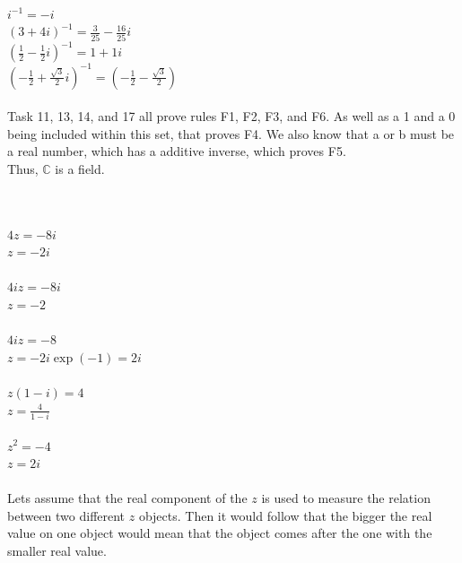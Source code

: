 \documentclass[12pt]{article}
\begin{document}
\\

$i^{-1} = -i$\\

$(3+4i)^{-1} = \frac{3}{25} - \frac{16}{25}i$\\

$(\frac{1}{2} - \frac{1}{2}i)^{-1} = 1 + 1i$\\

$(-\frac{1}{2} + \frac{\sqrt{3}}{2}i)^{-1} = (-\frac{1}{2}-\frac{\sqrt{3}}{2})$\\


\\
Task 11, 13, 14, and 17 all prove rules F1, F2, F3, and F6.
As well as a 1 and a 0 being included within this set, that proves F4. 
We also know that a or b must be a real number, which has a additive inverse, which proves F5.\\

Thus, $\mathbb{C}$ is a field.

\\

\\
$4z = -8i$\\
$z = -2i$\\

\\
$4iz = -8i$\\
$z = -2$\\

\\
$4iz = -8$\\
$z = -2i\exp(-1) = 2i$\\


\\
$z(1-i) = 4$\\
$z = \frac{4}{1-i}$\\


\\
$z^2 = -4$\\
$z = 2i$\\


\\

Lets assume that the real component of the $z$ is used to measure the relation between two different $z$ objects. 
Then it would follow that the bigger the real value on one object would mean that the object comes after the one with the smaller real value.\\
\end{document}
